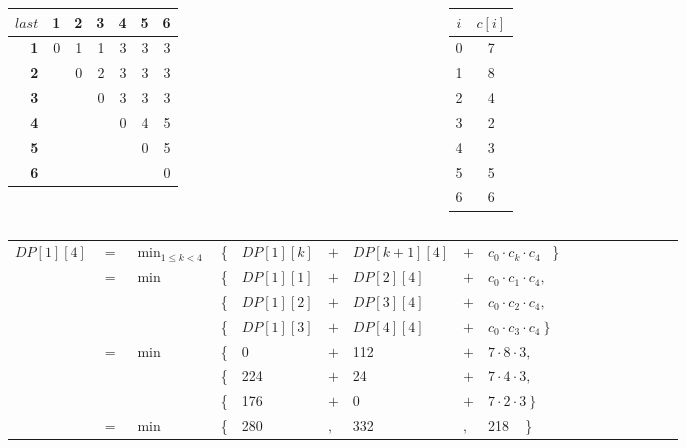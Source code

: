\begin{frame}{}

\begingroup
\renewcommand*{\arraystretch}{1.0}
\vspace{-6pt}
\begin{columns}[T]
\begin{tabular}{|r|r|r|r|r|r|r|}
\hline
$\mathit{last}$ &  \textbf{1} & \textbf{2} & \textbf{3} & \textbf{4} & \textbf{5} & \textbf{6} \\\hline
\textbf{1} & \phantom{0}0 & \phantom{0}1 & \phantom{0}1 & \phantom{0}\alert{3} & \phantom{0}3 & \phantom{0}3 \\\hline
\textbf{2} &   & 0 & 2 & 3 & 3 & 3 \\\hline
\textbf{3} &   &   & 0 & 3 & 3 & 3 \\\hline
\textbf{4} &   &   &   & 0 & 4 & 5 \\\hline
\textbf{5} &   &   &   &   & 0 & 5 \\\hline
\textbf{6} &   &   &   &   &   & 0 \\\hline
\end{tabular}
\begin{tabular}{|c|c|}
\hline
$i$ & $c[i]$ \\\hline
0 & 7 \\\hline
1 & 8 \\\hline
2 & 4 \\\hline
3 & 2 \\\hline
4 & 3 \\\hline
5 & 5 \\\hline
6 & 6 \\\hline
\end{tabular}
\end{columns}

\medskip
\setlength{\tabcolsep}{3pt}
\begin{tabular}{lllllllllllllllll}
$DP[1][4]$ & $=$ & $\displaystyle\min_{1 \leq k < 4}$ & \{ & $DP[1][k]$ & $+$ & $DP[k+1][4]$ & $+$ & $c_0 \cdot c_k \cdot c_4$ ~\} \\
        & $=$      & $\min$ & \{ & $DP[1][1]$ & $+$ & $DP[2][4]$ & $+$ & $c_0 \cdot c_1 \cdot c_4,$ \\
         &     &        & \{ & $DP[1][2]$ & $+$ & $DP[3][4]$ & $+$ & $c_0 \cdot c_2 \cdot c_4,$ \\
         &     &        & \{ & $DP[1][3]$ & $+$ & $DP[4][4]$ & $+$ & $c_0 \cdot c_3 \cdot c_4 ~\}$ \\
         &  $=$   & $\min$ & \{ & 0 & $+$ & 112 & $+$ & $7 \cdot 8 \cdot 3,$ \\
          &    &        & \{ & 224  & $+$ & 24 & $+$ & $7 \cdot 4 \cdot 3,$ \\
          &    &        & \{ & 176 & $+$ & 0 & $+$ & $7 \cdot 2 \cdot 3 ~\}$ \\
         &  $=$   & $\min$ & \{ & 280 & $,$ & 332 & $,$ & \alert{218} ~ \} \\
\end{tabular}
\endgroup

\end{frame}



